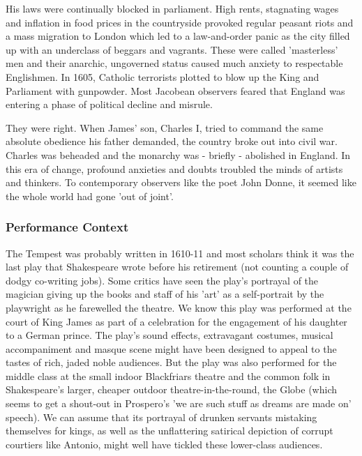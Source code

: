 			His laws were continually blocked in parliament. High rents, stagnating wages and inflation in food prices in the countryside provoked regular peasant riots and a mass migration to London which led to a law-and-order panic as the city filled up with an underclass of beggars and vagrants. These were called 'masterless' men and their anarchic, ungoverned status caused much anxiety to respectable Englishmen. In 1605, Catholic terrorists plotted to blow up the King and Parliament with gunpowder. Most Jacobean observers feared that England was entering a phase of political decline and misrule.

			They were right. When James' son, Charles I, tried to command the same absolute obedience his father demanded, the country broke out into civil war. Charles was beheaded and the monarchy was - briefly - abolished in England. In this era of change, profound anxieties and doubts troubled the minds of artists and thinkers. To contemporary observers like the poet John Donne, it seemed like the whole world had gone 'out of joint'.

		\subsubsection{Performance Context}
			The Tempest was probably written in 1610-11 and most scholars think it was the last play that Shakespeare wrote before his retirement (not counting a couple of dodgy co-writing jobs). Some critics have seen the play's portrayal of the magician giving up the books and staff of his 'art' as a self-portrait by the playwright as he farewelled the theatre. We know this play was performed at the court of King James as part of a celebration for the engagement of his daughter to a German prince. The play's sound effects, extravagant costumes, musical accompaniment and masque scene might have been designed to appeal to the tastes of rich, jaded noble audiences. But the play was also performed for the middle class at the small indoor Blackfriars theatre and the common folk in Shakespeare's larger, cheaper outdoor theatre-in-the-round, the Globe (which seems to get a shout-out in Prospero's 'we are such stuff as dreams are made on' speech). We can assume that its portrayal of drunken servants mistaking themselves for kings, as well as the unflattering satirical depiction of corrupt courtiers like Antonio, might well have tickled these lower-class audiences.


